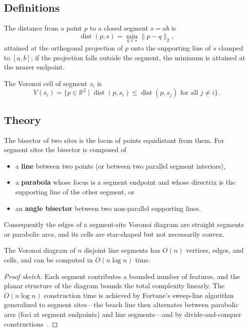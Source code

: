 \subsection{Definitions}

\begin{definition}\label{def:distance_to_segment}
The distance from a point $p$ to a closed segment $s = \overline{ab}$ is
\[
\operatorname{dist}(p, s) = \min_{q \in s} \|p - q\|_2,
\]
attained at the orthogonal projection of $p$ onto the supporting line of $s$
clamped to $[a, b]$; if the projection falls outside the segment, the minimum
is attained at the nearer endpoint.
\end{definition}

\begin{definition}\label{def:segment_voronoi_cell}
The Voronoi cell of segment $s_i$ is
\[
V(s_i) = \{p \in \mathbb{R}^2 \mid \operatorname{dist}(p, s_i) \le \operatorname{dist}(p, s_j)\text{ for all } j \ne i\}.
\]
\end{definition}

\subsection{Theory}

The bisector of two sites is the locus of points equidistant from them. For
segment sites the bisector is composed of
\begin{itemize}
\item a \textbf{line} between two points (or between two parallel segment
  interiors),
\item a \textbf{parabola} whose focus is a segment endpoint and whose
  directrix is the supporting line of the other segment, or
\item an \textbf{angle bisector} between two non-parallel supporting lines.
\end{itemize}

Consequently the edges of a segment-site Voronoi diagram are straight segments
or parabolic arcs, and its cells are star-shaped but not necessarily convex.

\begin{theorem}\label{thm:segment_voronoi_complexity}
The Voronoi diagram of $n$ disjoint line segments has $O(n)$ vertices, edges,
and cells, and can be computed in $O(n \log n)$ time.
\end{theorem}
\begin{proof}[Proof sketch]
Each segment contributes a bounded number of features, and the planar
structure of the diagram bounds the total complexity linearly. The $O(n \log
n)$ construction time is achieved by Fortune's sweep-line algorithm
generalized to segment sites---the beach line then alternates between parabolic
arcs (foci at segment endpoints) and line segments---and by divide-and-conquer
constructions~\cite{fortune1987,leedrysdale1981}.
\end{proof}


